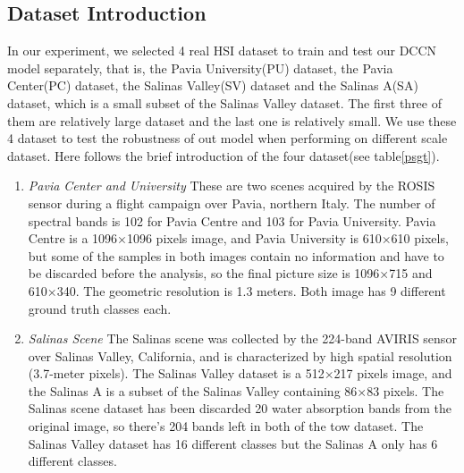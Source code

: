 \documentclass{article}
\begin{document}
	\subsection{Dataset Introduction}\label{subsec:dataset-introduction}
	In our experiment, we selected 4 real HSI dataset to train and test our DCCN model separately, that is, the
	Pavia University(PU) dataset, the Pavia Center(PC) dataset, the Salinas Valley(SV) dataset and the Salinas A(SA)
	dataset, which is a small subset of the Salinas Valley dataset.
	The first three of them are relatively large dataset and the last one is relatively small.
	We use these 4 dataset to test the robustness of out model when performing on different scale dataset.
	Here follows the brief introduction of the four dataset(see table\ref{psgt}).
	\begin{enumerate}[1)]
		\item \textit{Pavia Center and University} These are two scenes acquired by the ROSIS sensor during a flight
		campaign over Pavia, northern Italy.
		The number of spectral bands is 102 for Pavia Centre and 103 for Pavia University.
		Pavia Centre is a 1096×1096 pixels image, and Pavia University is 610×610 pixels, but some of the samples in
		both images contain no information and have to be discarded before the analysis, so the final picture size is
		1096×715 and 610×340.
		The geometric resolution is 1.3 meters.
		Both image has 9 different ground truth classes each.
		\item \textit{Salinas Scene} The Salinas scene was collected by the 224-band AVIRIS sensor over Salinas Valley,
		California, and is characterized by high spatial resolution (3.7-meter pixels).
		The Salinas Valley dataset is a 512×217 pixels image, and the Salinas A is a subset of the Salinas Valley
		containing 86×83 pixels.
		The Salinas scene dataset has been discarded 20 water absorption bands from the original image, so there's 204
		bands left in both of the tow dataset.
		The Salinas Valley dataset has 16 different classes but the Salinas A only has 6 different classes.
	\end{enumerate}
\end{document}
